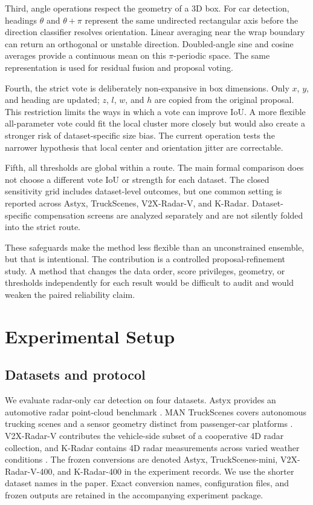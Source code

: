 \documentclass[preprint,12pt,times]{elsarticle}
\begin{document}
Third, angle operations respect the geometry of a 3D box. For car detection,
headings $\theta$ and $\theta+\pi$ represent the same undirected rectangular
axis before the direction classifier resolves orientation. Linear averaging
near the wrap boundary can return an orthogonal or unstable direction.
Doubled-angle sine and cosine averages provide a continuous mean on this
$\pi$-periodic space. The same representation is used for residual fusion and
proposal voting.

Fourth, the strict vote is deliberately non-expansive in box dimensions.
Only $x$, $y$, and heading are updated; $z$, $l$, $w$, and $h$ are copied from
the original proposal. This restriction limits the ways in which a vote can
improve IoU. A more flexible all-parameter vote could fit the local cluster
more closely but would also create a stronger risk of dataset-specific size
bias. The current operation tests the narrower hypothesis that local center
and orientation jitter are correctable.

Fifth, all thresholds are global within a route. The main formal comparison
does not choose a different vote IoU or strength for each dataset. The closed
sensitivity grid includes dataset-level outcomes, but one common setting is
reported across Astyx, TruckScenes, V2X-Radar-V, and K-Radar. Dataset-specific
compensation screens are analyzed separately and are not silently folded into
the strict route.

These safeguards make the method less flexible than an unconstrained ensemble,
but that is intentional. The contribution is a controlled proposal-refinement
study. A method that changes the data order, score privileges, geometry, or
thresholds independently for each result would be difficult to audit and
would weaken the paired reliability claim.

\section{Experimental Setup}

\subsection{Datasets and protocol}

We evaluate radar-only car detection on four datasets. Astyx provides an
automotive radar point-cloud benchmark \cite{meyer2019astyx}. MAN TruckScenes
covers autonomous trucking scenes and a sensor geometry distinct from
passenger-car platforms \cite{fent2024truckscenes}.
V2X-Radar-V contributes the vehicle-side subset of a cooperative 4D radar
collection, and K-Radar contains 4D radar measurements across varied weather
conditions \cite{paek2022kradar,yang2024v2xradar}. The frozen conversions are
denoted Astyx, TruckScenes-mini, V2X-Radar-V-400, and K-Radar-400 in the
experiment records. We use the shorter dataset names in the paper. Exact
conversion names, configuration files, and frozen outputs are retained in the
accompanying experiment package.
\end{document}
